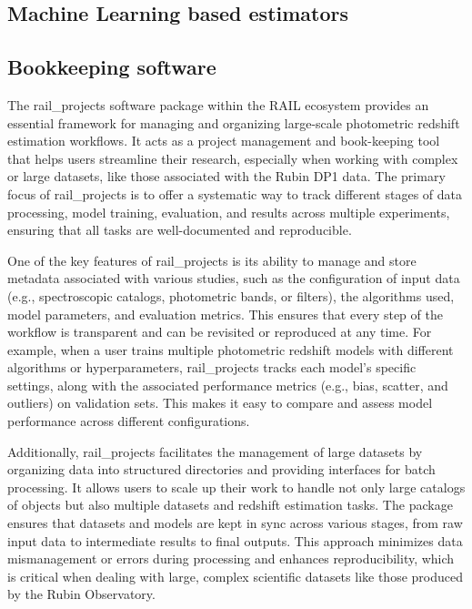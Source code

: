 \subsection{Machine Learning based estimators}
\label{sec:method:machine_learning}



\subsection{Bookkeeping software}
\label{sec:method:rail_project}


The rail\_projects software package within the RAIL ecosystem provides an essential framework for managing and organizing large-scale photometric redshift estimation workflows. It acts as a project management and book-keeping tool that helps users streamline their research, especially when working with complex or large datasets, like those associated with the Rubin DP1 data. The primary focus of rail\_projects is to offer a systematic way to track different stages of data processing, model training, evaluation, and results across multiple experiments, ensuring that all tasks are well-documented and reproducible.

One of the key features of rail\_projects is its ability to manage and store metadata associated with various studies, such as the configuration of input data (e.g., spectroscopic catalogs, photometric bands, or filters), the algorithms used, model parameters, and evaluation metrics. This ensures that every step of the workflow is transparent and can be revisited or reproduced at any time. For example, when a user trains multiple photometric redshift models with different algorithms or hyperparameters, rail\_projects tracks each model’s specific settings, along with the associated performance metrics (e.g., bias, scatter, and outliers) on validation sets. This makes it easy to compare and assess model performance across different configurations.

Additionally, rail\_projects facilitates the management of large datasets by organizing data into structured directories and providing interfaces for batch processing. It allows users to scale up their work to handle not only large catalogs of objects but also multiple datasets and redshift estimation tasks. The package ensures that datasets and models are kept in sync across various stages, from raw input data to intermediate results to final outputs. This approach minimizes data mismanagement or errors during processing and enhances reproducibility, which is critical when dealing with large, complex scientific datasets like those produced by the Rubin Observatory.

